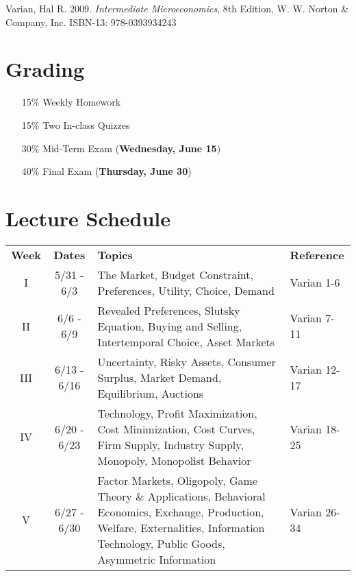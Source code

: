 \documentclass{article}
\begin{document}
Varian, Hal R. 2009. \textit{Intermediate Microeconomics}, 8th Edition, W. W. Norton \& Company, Inc. ISBN-13: 978-0393934243

\section*{Grading}

\begin{itemize}
\item [15\%] Weekly Homework
\item [15\%] Two In-class Quizzes
\item [30\%] Mid-Term Exam (\textbf{Wednesday, June 15})
\item [40\%] Final Exam (\textbf{Thursday, June 30})
\end{itemize}

\section*{Lecture Schedule}

\begin{table}[h]
\centering
\begin{tabular}{c c p{7cm} l}
\textbf{Week} & \textbf{Dates} & \textbf{Topics} & \textbf{Reference} \\
I & 5/31 - 6/3 & The Market, Budget Constraint, Preferences, Utility, Choice, Demand & Varian 1-6 \\
II & 6/6 - 6/9 & Revealed Preferences, Slutsky Equation, Buying and Selling, Intertemporal Choice, Asset Markets & Varian 7-11 \\
III & 6/13 - 6/16 & Uncertainty, Risky Assets, Consumer Surplus, Market Demand, Equilibrium, Auctions & Varian 12-17 \\
IV & 6/20 - 6/23 & Technology, Profit Maximization, Cost Minimization, Cost Curves, Firm Supply, Industry Supply, Monopoly, Monopolist Behavior & Varian 18-25 \\ 
V & 6/27 - 6/30 & Factor Markets, Oligopoly, Game Theory \& Applications, Behavioral Economics, Exchange, Production, Welfare, Externalities, Information Technology, Public Goods, Asymmetric Information & Varian 26-34 \\
\end{tabular}
\end{table}
\end{document}
